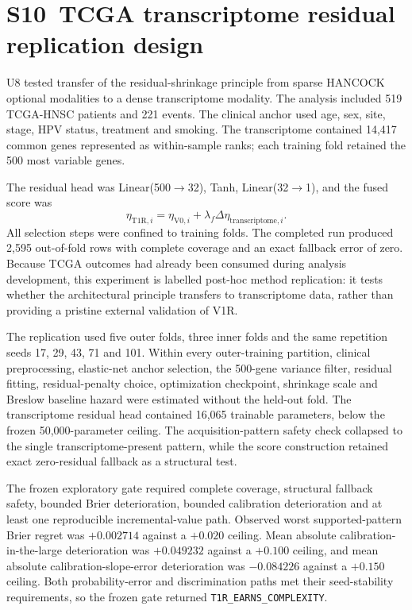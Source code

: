 \section*{S10~TCGA transcriptome residual replication design}
U8 tested transfer of the residual-shrinkage principle from sparse HANCOCK optional modalities to a dense transcriptome modality. The analysis included 519 TCGA-HNSC patients and 221 events. The clinical anchor used age, sex, site, stage, HPV status, treatment and smoking. The transcriptome contained 14,417 common genes represented as within-sample ranks; each training fold retained the 500 most variable genes.

The residual head was Linear(500$\rightarrow$32), Tanh, Linear(32$\rightarrow$1), and the fused score was
\begin{equation}
\eta_{\mathrm{T1R},i}=\eta_{\mathrm{V0},i}+\lambda_f\Delta\eta_{\mathrm{transcriptome},i}.
\end{equation}
All selection steps were confined to training folds. The completed run produced 2,595 out-of-fold rows with complete coverage and an exact fallback error of zero. Because TCGA outcomes had already been consumed during analysis development, this experiment is labelled post-hoc method replication: it tests whether the architectural principle transfers to transcriptome data, rather than providing a pristine external validation of V1R.

The replication used five outer folds, three inner folds and the same repetition seeds 17, 29, 43, 71 and 101. Within every outer-training partition, clinical preprocessing, elastic-net anchor selection, the 500-gene variance filter, residual fitting, residual-penalty choice, optimization checkpoint, shrinkage scale and Breslow baseline hazard were estimated without the held-out fold. The transcriptome residual head contained 16,065 trainable parameters, below the frozen 50,000-parameter ceiling. The acquisition-pattern safety check collapsed to the single transcriptome-present pattern, while the score construction retained exact zero-residual fallback as a structural test.

The frozen exploratory gate required complete coverage, structural fallback safety, bounded Brier deterioration, bounded calibration deterioration and at least one reproducible incremental-value path. Observed worst supported-pattern Brier regret was $+0.002714$ against a $+0.020$ ceiling. Mean absolute calibration-in-the-large deterioration was $+0.049232$ against a $+0.100$ ceiling, and mean absolute calibration-slope-error deterioration was $-0.084226$ against a $+0.150$ ceiling. Both probability-error and discrimination paths met their seed-stability requirements, so the frozen gate returned \texttt{T1R\_EARNS\_COMPLEXITY}.

